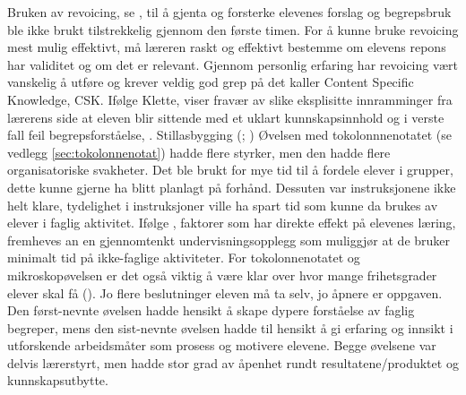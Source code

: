 \documentclass[main.tex]{subfiles}
\begin{document}
Bruken av revoicing, se , til å gjenta og forsterke elevenes forslag og begrepsbruk ble ikke brukt tilstrekkelig gjennom den første timen.
For å kunne bruke revoicing mest mulig effektivt, må læreren raskt og effektivt bestemme om elevens repons har validitet og om det er relevant.
Gjennom personlig erfaring har revoicing vært vanskelig å utføre og krever veldig god grep på det  kaller Content Specific Knowledge, CSK.
Ifølge Klette, viser fravær av slike eksplisitte innramminger fra lærerens side at eleven blir sittende med et uklart kunnskapsinnhold og i verste fall feil
begrepsforståelse, . 
\newline
\newline
Stillasbygging (; )
\newline
\newline
Øvelsen med tokolonnnenotatet (se vedlegg \ref{sec:tokolonnenotat}) hadde flere styrker, men den hadde flere organisatoriske svakheter. Det ble brukt for mye
tid til å fordele elever i grupper, dette kunne gjerne ha blitt planlagt på forhånd. Dessuten var instruksjonene ikke helt klare, tydelighet i instruksjoner
ville ha spart tid som kunne da brukes av elever i faglig aktivitet. Ifølge , faktorer som har direkte effekt på elevenes læring,
fremheves an en gjennomtenkt undervisningsopplegg som muliggjør at de bruker minimalt tid på ikke-faglige aktiviteter. For tokolonnenotatet og mikroskopøvelsen 
er det også viktig å være klar over hvor mange frihetsgrader elever skal få (). Jo flere beslutninger eleven må ta selv, jo åpnere er oppgaven. Den først-nevnte
øvelsen hadde hensikt å skape dypere forståelse av faglig begreper, mens den sist-nevnte øvelsen hadde til hensikt å gi erfaring og innsikt i utforskende
arbeidsmåter som prosess og motivere elevene. Begge øvelsene var delvis lærerstyrt, men hadde stor grad av åpenhet rundt resultatene/produktet og kunnskapsutbytte.
\end{document}
